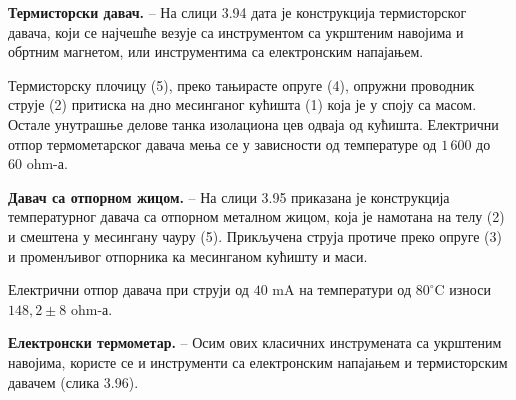 \documentclass[12pt,a4paper]{report}
\begin{document}

\textbf{Термисторски давач.} – На слици 3.94 дата је конструкција термисторског давача, који се најчешће везује са инструментом са укрштеним
навојима и обртним магнетом, или инструментима са електронским напајањем.


Термисторску плочицу (5), преко тањирасте опруге (4), опружни проводник струје (2) притиска на дно месинганог кућишта (1) која је у споју са масом. Остале унутрашње делове танка изолациона цев одваја од кућишта. Електрични отпор термометарског давача мења се у зависности од температуре од $1\,600$ до $60\text{ ohm-а}$.

\textbf{Давач са отпорном жицом.} – На слици 3.95 приказана је конструкција температурног давача са отпорном металном жицом, која је намотана на телу (2) и смештена у месингану чауру (5). Прикључена струја протиче преко опруге (3) и променљивог отпорника ка месинганом кућишту и маси.


Електрични отпор давача при струји од $40\text{ mA}$ на температури од $80^\circ\text{C}$ износи $148{,}2 \pm 8\text{ ohm-а}$.

\textbf{Електронски термометар.} – Осим ових класичних инструмената са укрштеним навојима, користе се и инструменти са електронским напајањем и термисторским давачем (слика 3.96).
\end{document}
